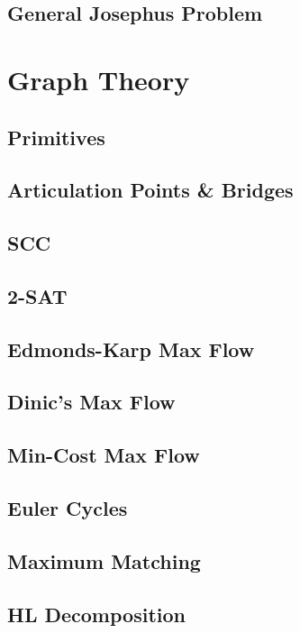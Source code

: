 		\subsection{General Josephus Problem}
			
	\section{Graph Theory}
		\subsection{Primitives}
			
		\subsection{Articulation Points \& Bridges}
			
		\subsection{SCC}
			
		\subsection{2-SAT}
			
		\subsection{Edmonds-Karp Max Flow}
			
		\subsection{Dinic's Max Flow}
			
		\subsection{Min-Cost Max Flow}
			
		\subsection{Euler Cycles}
			
		\subsection{Maximum Matching}
			
		\subsection{HL Decomposition}
			
